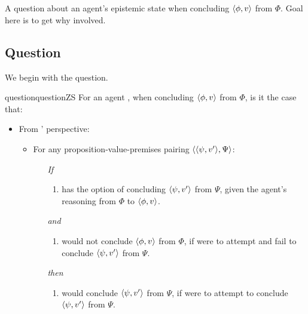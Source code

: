 \section{\zS{}}
\label{cha:zS:sec:question}

\begin{note}
  A question about an agent's epistemic state when concluding \(\langle \phi, v \rangle\) from \(\Phi\).
  Goal here is to get why involved.
\end{note}

\subsection{Question}
\label{cha:zS:sec:the-question}

\begin{note}
  We begin with the question.

  \begin{restatable}[\qzS{}]{question}{questionZS}
    \label{question:zs}
    For an agent \vAgent{}, when concluding \(\langle \phi, v \rangle\) from \(\Phi\), is it the case that:

    \begin{itemize}
    \item
      From \vAgent{}' perspective:
      \begin{itemize}
      \item
        For any proposition-value-premises pairing \(\langle \langle \psi, v' \rangle, \Psi \rangle\):
        \begin{itemize}
        \item[\emph{If}]
          \begin{enumerate}[label=\alph*., ref=(\alph*)]
          \item
            \label{question:zs:option}
            \vAgent{} has the option of concluding \(\langle \psi, v' \rangle\) from \(\Psi\), given the agent's reasoning from \(\Phi\) to \(\langle \phi, v \rangle\).
          \end{enumerate}
        \item[\emph{and}]
          \begin{enumerate}[label=\alph*., ref=(\alph*), resume]
          \item
            \label{question:zs:subjunctive}
            \vAgent{} would not conclude \(\langle \phi, v \rangle\) from \(\Phi\), if \vAgent{} were to attempt and fail to conclude \(\langle \psi, v' \rangle\) from \(\Psi\).%
          \end{enumerate}
        \item[\emph{then}]
          \begin{enumerate}[label=\alph*., ref=(\alph*), resume]
          \item
            \label{question:zs:may-fail}
            \vAgent{} would conclude \(\langle \psi, v' \rangle\) from \(\Psi\), if \vAgent{} were to attempt to conclude \(\langle \psi, v' \rangle\) from \(\Psi\).
          \end{enumerate}
        \end{itemize}
      \end{itemize}
    \end{itemize}
    \vspace{-\baselineskip}
  \end{restatable}
\end{note}

